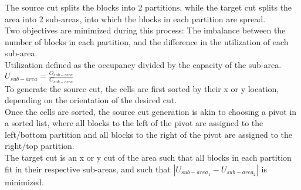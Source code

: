 \documentclass{article}
\begin{document}
\begin{multicols}{2}
\begin{itemize}
            The source cut splits the blocks into 2 partitions, while the target cut splits the area into 2 sub-areas, into which the blocks in each partition are spread. \\
            Two objectives are minimized during this process: The imbalance between the number of blocks in each partition, and the difference in the utilization of each sub-area. \\
            Utilization defined as the occupancy divided by the capacity of the sub-area. \\
            \(U_{sub-area} = \frac{O_{sub-area}}{C_{sub-area}}\) \\
            To generate the source cut, the cells are first sorted by their x or y location, depending on the orientation of the desired cut. \\
            Once the cells are sorted, the source cut generation is akin to choosing a pivot in a sorted list, where all blocks to the left of the pivot are assigned to the left/bottom partition and all blocks to the right of the pivot are assigned to the right/top partition. \\
            The target cut is an x or y cut of the area such that all blocks in each partition fit in their respective sub-areas, and such that \( | U_{sub-area_1} 
             - U_{sub-area_2} | \) is minimized.




    \end{itemize}






\end{multicols}
\end{document}
